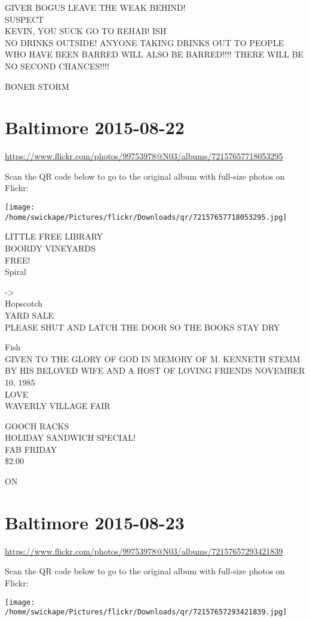 \documentclass[10pt,letterpaper]{article}
\begin{document}
GIVER BOGUS LEAVE THE WEAK BEHIND!\\
SUSPECT\\
KEVIN, YOU SUCK GO TO REHAB! ISH\\
NO DRINKS OUTSIDE!  ANYONE TAKING DRINKS OUT TO PEOPLE WHO HAVE BEEN BARRED WILL ALSO BE BARRED!!!! THERE WILL BE NO SECOND CHANCES!!!!

BONER STORM


\section*{Baltimore 2015-08-22}

\url{https://www.flickr.com/photos/99753978@N03/albums/72157657718053295}

Scan the QR code below to go to the original album with full-size photos on Flickr:

\texttt{[image: /home/swickape/Pictures/flickr/Downloads/qr/72157657718053295.jpg]}


LITTLE FREE LIBRARY\\
BOORDY VINEYARDS\\
FREE!\\
Spiral

{-}>\\
Hopscotch\\
YARD SALE\\
PLEASE SHUT AND LATCH THE DOOR SO THE BOOKS STAY DRY

Fish\\
GIVEN TO THE GLORY OF GOD IN MEMORY OF M. KENNETH STEMM BY HIS BELOVED WIFE AND A HOST OF LOVING FRIENDS NOVEMBER 10, 1985\\
LOVE\\
WAVERLY VILLAGE FAIR

GOOCH RACKS\\
HOLIDAY SANDWICH SPECIAL!\\
FAB FRIDAY\\
\$2.00

ON


\section*{Baltimore 2015-08-23}

\url{https://www.flickr.com/photos/99753978@N03/albums/72157657293421839}

Scan the QR code below to go to the original album with full-size photos on Flickr:

\texttt{[image: /home/swickape/Pictures/flickr/Downloads/qr/72157657293421839.jpg]}
\end{document}
